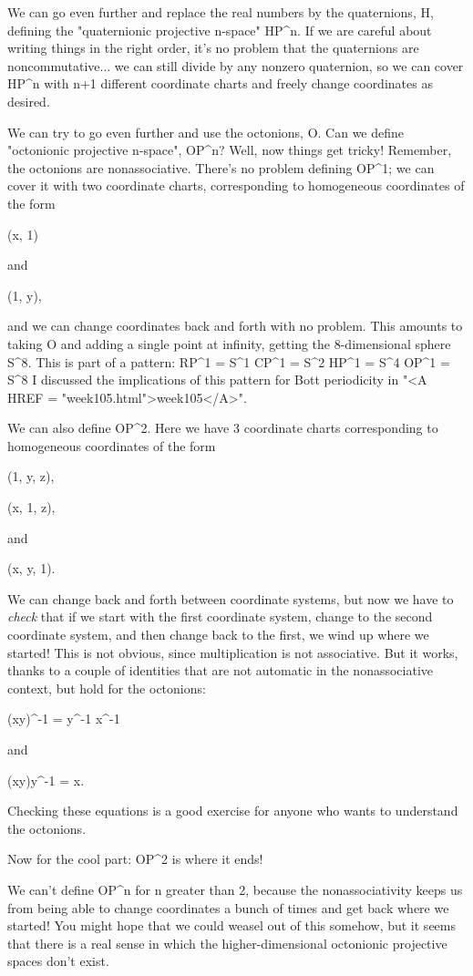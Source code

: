 We can go even further and replace the real numbers by the
quaternions, H, defining the "quaternionic projective n-space" HP^{n}.
If we are careful about writing things in the right order, it's no
problem that the quaternions are noncommutative... we can still divide
by any nonzero quaternion, so we can cover HP^{n} with n+1 different
coordinate charts and freely change coordinates as desired.

We can try to go even further and use the octonions, O.  Can we define
"octonionic projective n-space", OP^{n}?  Well, now things get tricky!
Remember, the octonions are nonassociative.  There's no problem
defining OP^{1}; we can cover it with two coordinate charts,
corresponding to homogeneous coordinates of the form

(x, 1) 

and 

(1, y),

and we can change coordinates back and forth with no problem.  This
amounts to taking O and adding a single point at infinity, getting the
8-dimensional sphere S^{8}.  This is part of a pattern:
RP^{1} = S^{1}
CP^{1} = S^{2}
HP^{1} = S^{4}
OP^{1} = S^{8}
I discussed the implications of this pattern for Bott periodicity in 
"<A HREF = "week105.html">week105</A>".  

We can also define OP^{2}.  Here we have 3 coordinate charts
corresponding to homogeneous coordinates of the form

(1, y, z), 

(x, 1, z), 

and 

(x, y, 1). 

We can change back and forth between coordinate systems, but now we
have to \emph{check} that if we start with the first coordinate system,
change to the second coordinate system, and then change back to the
first, we wind up where we started!  This is not obvious, since
multiplication is not associative.  But it works, thanks to a couple
of identities that are not automatic in the nonassociative context,
but hold for the octonions:

(xy)^{-1} = y^{-1} x^{-1}

and 

(xy)y^{-1} = x.

Checking these equations is a good exercise for anyone who wants to
understand the octonions.

Now for the cool part: OP^{2} is where it ends!  

We can't define OP^{n} for n greater than 2, because the
nonassociativity keeps us from being able to change coordinates a
bunch of times and get back where we started!  You might hope that we
could weasel out of this somehow, but it seems that there is a real
sense in which the higher-dimensional octonionic projective spaces
don't exist.

